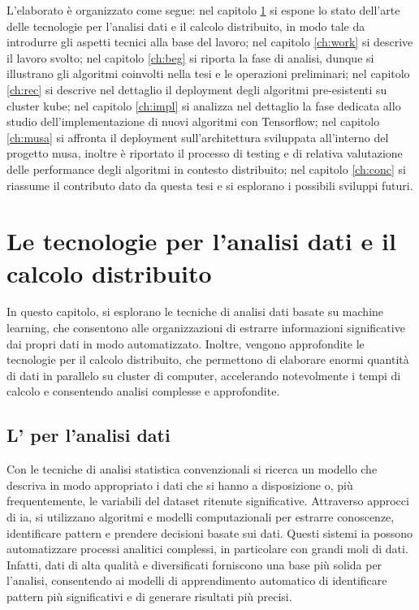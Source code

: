 \documentclass[12pt,a4paper,fleqn,titlepage]{report}
\begin{document}
    L'elaborato è organizzato come segue: nel capitolo \ref{ch:tec} si espone lo stato dell'arte delle tecnologie per l'analisi dati e il calcolo distribuito, in modo tale da introdurre gli aspetti tecnici alla base del lavoro; nel capitolo \ref{ch:work} si descrive il lavoro svolto; nel capitolo \ref{ch:beg} si riporta la fase di analisi, dunque si illustrano gli algoritmi coinvolti nella tesi e le operazioni preliminari; nel capitolo \ref{ch:rec} si descrive nel dettaglio il deployment degli algoritmi pre-esistenti su \gls{cluster} \gls{kube}; nel capitolo \ref{ch:impl} si analizza nel dettaglio la fase dedicata allo studio dell'implementazione di nuovi algoritmi con Tensorflow; nel capitolo \ref{ch:musa} si affronta il deployment sull'architettura sviluppata all'interno del progetto \gls{musa}, inoltre è riportato il processo di testing e di relativa valutazione delle performance degli algoritmi in contesto distribuito; nel capitolo \ref{ch:conc} si riassume il contributo dato da questa tesi e si esplorano i possibili sviluppi futuri.

\chapter{Le tecnologie per l'analisi dati e il calcolo distribuito}\label{ch:tec}
    In questo capitolo, si esplorano le tecniche di analisi dati basate su machine learning, che consentono alle organizzazioni di estrarre informazioni significative dai propri dati in modo automatizzato. Inoltre, vengono approfondite le tecnologie per il calcolo distribuito, che permettono di elaborare enormi quantità di dati in parallelo su \gls{cluster} di computer, accelerando notevolmente i tempi di calcolo e consentendo analisi complesse e approfondite.

    \section{L' per l'analisi dati}\label{sec:ai}
        Con le tecniche di analisi statistica convenzionali si ricerca un modello che descriva in modo appropriato i dati che si hanno a disposizione o, più frequentemente, le variabili del dataset ritenute significative.
        Attraverso approcci di \gls{ia}, si utilizzano algoritmi e modelli computazionali per estrarre conoscenze, identificare pattern e prendere decisioni basate sui dati. Questi sistemi \gls{ia} possono automatizzare processi analitici complessi, in particolare con grandi moli di dati. Infatti, dati di alta qualità e diversificati forniscono una base più solida per l'analisi, consentendo ai modelli di apprendimento automatico di identificare pattern più significativi e di generare risultati più precisi.
\end{document}
